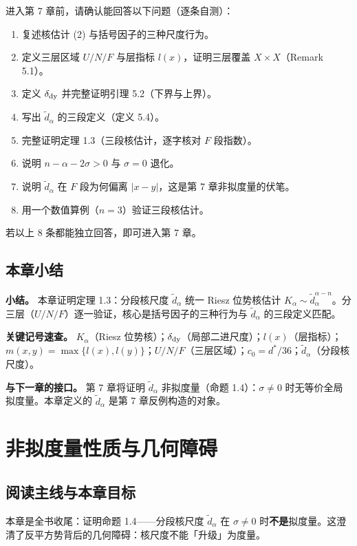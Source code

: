 \documentclass[a4paper,11pt,openany]{ctexbook}
\numberwithin{equation}{chapter}
\numberwithin{figure}{chapter}
\numberwithin{table}{chapter}
\begin{document}
进入第 7 章前，请确认能回答以下问题（逐条自测）：

\begin{enumerate}
\item 复述核估计 (2) 与括号因子的三种尺度行为。
\item 定义三层区域 $U/N/F$ 与层指标 $l(x)$，证明三层覆盖 $X\times X$（Remark 5.1）。
\item 定义 $\delta_{\rm dy}$ 并完整证明引理 5.2（下界与上界）。
\item 写出 $\widetilde d_\alpha$ 的三段定义（定义 5.4）。
\item 完整证明定理 1.3（三段核估计，逐字核对 $F$ 段指数）。
\item 说明 $n-\alpha-2\sigma>0$ 与 $\sigma=0$ 退化。
\item 说明 $\widetilde d_\alpha$ 在 $F$ 段为何偏离 $|x-y|$，这是第 7 章非拟度量的伏笔。
\item 用一个数值算例（$n=3$）验证三段核估计。
\end{enumerate}

若以上 8 条都能独立回答，即可进入第 7 章。

\section{本章小结}

\textbf{小结。} 本章证明定理 1.3：分段核尺度 $\widetilde d_\alpha$ 统一 Riesz 位势核估计 $K_\alpha\sim\widetilde d_\alpha^{\alpha-n}$。分三层（$U/N/F$）逐一验证，核心是括号因子的三种行为与 $\widetilde d_\alpha$ 的三段定义匹配。

\textbf{关键记号速查。} $K_\alpha$（Riesz 位势核）；$\delta_{\rm dy}$（局部二进尺度）；$l(x)$（层指标）；$m(x,y)=\max\{l(x),l(y)\}$；$U/N/F$（三层区域）；$c_0=d^*/36$；$\widetilde d_\alpha$（分段核尺度）。

\textbf{与下一章的接口。} 第 7 章将证明 $\widetilde d_\alpha$ 非拟度量（命题 1.4）：$\sigma\neq0$ 时无等价全局拟度量。本章定义的 $\widetilde d_\alpha$ 是第 7 章反例构造的对象。


\clearpage

\chapter{非拟度量性质与几何障碍}
\section{阅读主线与本章目标}

本章是全书收尾：证明命题 1.4——分段核尺度 $\widetilde d_\alpha$ 在 $\sigma\neq0$ 时\textbf{不是}拟度量。这澄清了反平方势背后的几何障碍：核尺度不能「升级」为度量。
\end{document}
